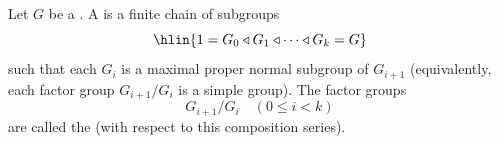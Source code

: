 \begin{definition} \label{definition:composition_series_and_composition_factors_of_a_group}
Let $G$ be a . A  is a finite chain of subgroups
$$\hlin{1 = G_0 \triangleleft G_1 \triangleleft \cdots \triangleleft G_k = G}$$
such that each $G_i$ is a maximal proper normal subgroup of $G_{i+1}$ (equivalently, each factor group $G_{i+1}/G_i$ is a simple group). The factor groups
$$G_{i+1}/G_i \quad (0 \leq i < k)$$
are called the  (with respect to this composition series).
\end{definition}